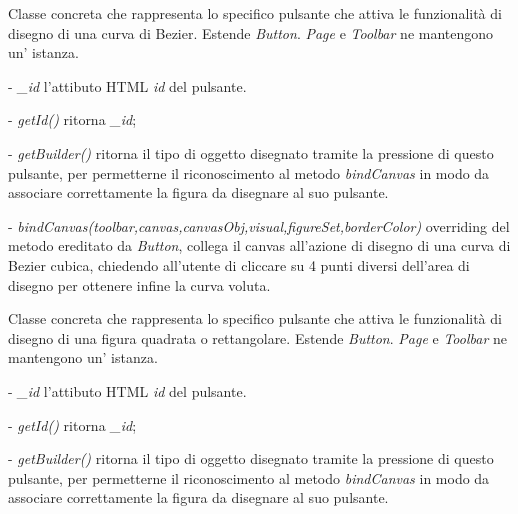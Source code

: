 Classe concreta che rappresenta lo specifico pulsante che attiva le funzionalit\` a di disegno di una curva di Bezier.
Estende \textit{Button}.
\textit{Page} e \textit{Toolbar} ne mantengono un' istanza.
\begin{elencopuntato}[\subsubsecindent]
\item[-] \textit{{\_}id} l'attibuto HTML \textit{id} del pulsante.
\end{elencopuntato}
\begin{elencopuntato}[\subsubsecindent]
\item[-] \textit{getId()} ritorna \textit{{\_}id};
\item[-] \textit{getBuilder()} ritorna il tipo di oggetto disegnato tramite la pressione di questo pulsante, per permetterne il riconoscimento al metodo \textit{bindCanvas} in modo da associare correttamente la figura da disegnare al suo pulsante.
\item[-]  \textit{bindCanvas(toolbar,canvas,canvasObj,visual,figureSet,borderColor)} overriding del metodo ereditato da \textit{Button}, collega il canvas all'azione di disegno di una curva di Bezier cubica,  chiedendo all'utente di cliccare su 4 punti diversi dell'area di disegno per ottenere infine la curva voluta.
\end{elencopuntato}

Classe concreta che rappresenta lo specifico pulsante che attiva le funzionalit\` a di disegno di una figura quadrata o rettangolare.
Estende \textit{Button}.
\textit{Page} e \textit{Toolbar} ne mantengono un' istanza.
\begin{elencopuntato}[\subsubsecindent]
\item[-] \textit{{\_}id} l'attibuto HTML \textit{id} del pulsante.
\end{elencopuntato}
\begin{elencopuntato}[\subsubsecindent]
\item[-] \textit{getId()} ritorna \textit{{\_}id};
\item[-] \textit{getBuilder()} ritorna il tipo di oggetto disegnato tramite la pressione di questo pulsante, per permetterne il riconoscimento al metodo \textit{bindCanvas} in modo da associare correttamente la figura da disegnare al suo pulsante.
\end{elencopuntato}

